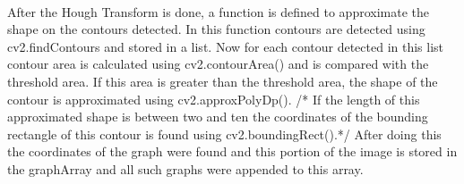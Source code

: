 \documentclass[12pts]{scrreprt}
\begin{document}
\paragraph{}
After the Hough Transform is done, a function is defined to approximate the shape on the contours detected. In this function contours are detected using cv2.findContours and stored in a list. Now for each contour detected in this list contour area is calculated using cv2.contourArea() and is compared with the threshold area. If this area is greater than the threshold area, the shape of the contour is approximated using cv2.approxPolyDp(). /* If the length of this approximated shape is between two and ten the coordinates of the bounding rectangle of this contour is found using cv2.boundingRect().*/ After doing this the coordinates of the graph were found and this portion of the image is stored in the graphArray and all such graphs were appended to this array.
\end{document}
